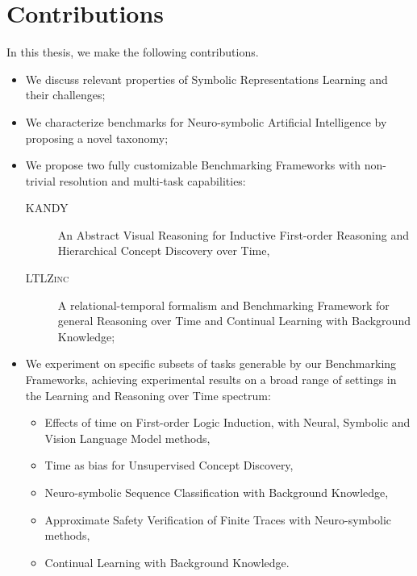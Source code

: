 \section{Contributions}
In this thesis, we make the following contributions.
\begin{itemize}
	\item We discuss relevant properties of Symbolic Representations Learning and their challenges;
	\item We characterize benchmarks for Neuro-symbolic Artificial Intelligence by proposing a novel taxonomy;
	\item We propose two fully customizable Benchmarking Frameworks with non-trivial resolution and multi-task capabilities:
	\begin{description}
		\item [\textsc{KANDY}] An Abstract Visual Reasoning for Inductive First-order Reasoning and Hierarchical Concept Discovery over Time,
		\item [\textsc{LTLZinc}] A relational-temporal formalism and Benchmarking Framework for general Reasoning over Time and Continual Learning with Background Knowledge;
	\end{description}
\item We experiment on specific subsets of tasks generable by our Benchmarking Frameworks, achieving experimental results on a broad range of settings in the Learning and Reasoning over Time spectrum:
\begin{itemize}
	\item Effects of time on First-order Logic Induction, with Neural, Symbolic and Vision Language Model methods,
	\item Time as bias for Unsupervised Concept Discovery,
	\item Neuro-symbolic Sequence Classification with Background Knowledge,
	\item Approximate Safety Verification of Finite Traces with Neuro-symbolic methods,
	\item Continual Learning with Background Knowledge.
	\end{itemize}
\end{itemize}